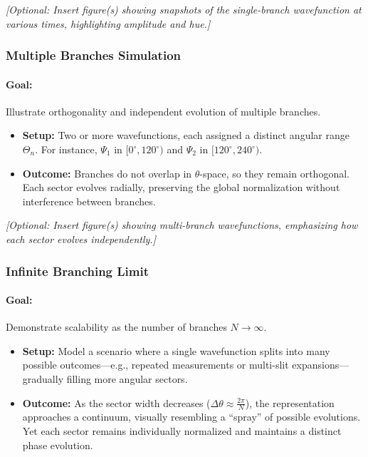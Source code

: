 \documentclass{article}
\begin{document}
\noindent
\textit{[Optional: Insert figure(s) showing snapshots of the single-branch wavefunction at various times, highlighting amplitude and hue.]}


\subsubsection{Multiple Branches Simulation}
\paragraph{Goal:} Illustrate orthogonality and independent evolution of multiple branches.
\begin{itemize}
    \item \textbf{Setup:} Two or more wavefunctions, each assigned a distinct angular range \(\Theta_n\). For instance, \(\Psi_1\) in \([0^\circ,120^\circ)\) and \(\Psi_2\) in \([120^\circ,240^\circ)\).
    \item \textbf{Outcome:} Branches do not overlap in \(\theta\)-space, so they remain orthogonal. Each sector evolves radially, preserving the global normalization without interference between branches.
\end{itemize}

\noindent
\textit{[Optional: Insert figure(s) showing multi-branch wavefunctions, emphasizing how each sector evolves independently.]}



\subsubsection{Infinite Branching Limit}
\paragraph{Goal:} Demonstrate scalability as the number of branches \(N\to\infty\).
\begin{itemize}
    \item \textbf{Setup:} Model a scenario where a single wavefunction splits into many possible outcomes—e.g., repeated measurements or multi-slit expansions—gradually filling more angular sectors.
    \item \textbf{Outcome:} As the sector width decreases (\(\Delta\theta \approx \tfrac{2\pi}{N}\)), the representation approaches a continuum, visually resembling a “spray” of possible evolutions. Yet each sector remains individually normalized and maintains a distinct phase evolution.
\end{itemize}
\end{document}
